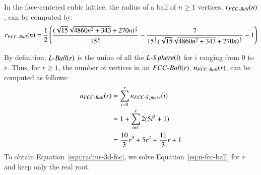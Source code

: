 \begin{thm}
	In the face-centered cubic lattice, the radius of a ball of $n \geq 1$ vertices, $r_{\mathop{FCC{\textnormal{-}Ball}}}(n)$, can be computed by:
	\begin{multline}
	\label{eqn:radius-3d-fcc}
	r_{\mathop{FCC{\textnormal{-}Ball}}}(n) = \frac{1}{2} \left(\frac{(\sqrt{15} \sqrt{4860 n^2+343}+270 n)^\frac{1}{3}}{15^{\frac{2}{3}}} - 	\frac{7}{15^{\frac{1}{3}} (\sqrt{15} \sqrt{4860 n^2+343}+270 n)^{\frac{1}{3}}} - 1\right)
	\end{multline}
\end{thm}

\begin{pf}
	By definition, $\mathop{L{\textnormal{-}Ball}}(r)$ is the union of all the $\mathop{L{\textnormal{-}Sphere}}(i)$ for $i$ ranging from $0$ to $r$. Thus, for $r \geq 1$, the number of vertices in an $\mathop{FCC{\textnormal{-}Ball}}(r)$, $n_{\mathop{FCC{\textnormal{-}Ball}}}(r)$, can be computed as follows:
	\begin{align}
	n_{\mathop{FCC{\textnormal{-}Ball}}}(r) & = \sum_{i=0}^{r} n_{\mathop{FCC{\textnormal{-}Sphere}}}(i) \\
	& =  1 + \sum_{i=1}^{r} 2 (5i^2 + 1)\\
	& = \frac{10}{3} r^3 + 5r^2 + \frac{11}{3}r + 1
	\label{eq:n-fcc-ball}
	\end{align}
	To obtain Equation~\ref{eqn:radius-3d-fcc}, we solve Equation~\eqref{eq:n-fcc-ball} for $r$ and keep only the real root.
\end{pf}
